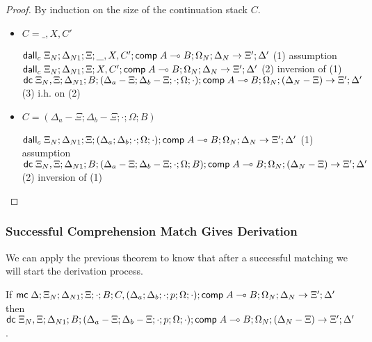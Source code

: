 \begin{proof}
   By induction on the size of the continuation stack $C$.
   
   \begin{itemize}
      \item $C = \_, X, C'$
      
      $\mathsf{dall}_c \; \Xi_N; \Delta_{N1}; \Xi; \_, X, C'; \mathsf{comp} \; A \multimap B; \Omega_N; \Delta_N \rightarrow \Xi'; \Delta'$ \hfill (1) assumption \\
      $\mathsf{dall}_c \; \Xi_N; \Delta_{N1}; \Xi; X, C'; \mathsf{comp} \; A \multimap B; \Omega_N; \Delta_N \rightarrow \Xi'; \Delta'$ \hfill (2) inversion of (1) \\
      $\mathsf{dc} \; \Xi_N, \Xi; \Delta_{N1}; B; (\Delta_a - \Xi; \Delta_b - \Xi; \cdot; \Omega; \cdot); \mathsf{comp} \; A \multimap B; \Omega_N; (\Delta_N - \Xi) \rightarrow \Xi'; \Delta'$ \hfill (3) i.h. on (2) \\
      
      \item $C = (\Delta_a - \Xi; \Delta_b - \Xi; \cdot; \Omega; B)$
      
      $\mathsf{dall}_c \; \Xi_N; \Delta_{N1}; \Xi; (\Delta_a; \Delta_b; \cdot; \Omega; \cdot); \mathsf{comp} \; A \multimap B; \Omega_N; \Delta_N \rightarrow \Xi'; \Delta'$ \hfill (1) assumption \\
      $\mathsf{dc} \; \Xi_N, \Xi; \Delta_{N1}; B; (\Delta_a - \Xi; \Delta_b - \Xi; \cdot; \Omega; B); \mathsf{comp} \; A \multimap B; \Omega_N; (\Delta_N - \Xi) \rightarrow \Xi'; \Delta'$ \hfill (2) inversion of (1) \\
   \end{itemize}
\end{proof}

\subsubsection{Successful Comprehension Match Gives Derivation}

We can apply the previous theorem to know that after a successful matching we will start the derivation process.

\begin{lemma}
If $\mathsf{mc} \; \Delta; \Xi_N; \Delta_{N1}; \Xi; \cdot; B; C, (\Delta_a; \Delta_b; \cdot; p; \Omega; \cdot); \mathsf{comp} \; A \multimap B; \Omega_N; \Delta_N \rightarrow \Xi'; \Delta'$ then
$\mathsf{dc} \; \Xi_N, \Xi; \Delta_{N1}; B; (\Delta_a - \Xi; \Delta_b - \Xi; \cdot; p; \Omega; \cdot); \mathsf{comp} \; A \multimap B; \Omega_N; (\Delta_N - \Xi) \rightarrow \Xi'; \Delta'$.
\end{lemma}

